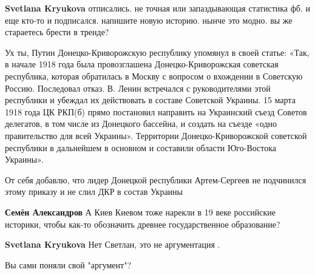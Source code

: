 \begin{itemize}
\begin{itemize}
\textbf{Svetlana Kryukova} отписались. не точная или запаздывающая статистика фб. и еще кто-то и подписался. напишите новую историю. нынче это модно. вы же стараетесь брести в тренде?

 

Ух ты, Путин Донецко-Криворожскую республику упомянул в своей статье: «Так, в
начале 1918 года была провозглашена Донецко-Криворожская советская республика,
которая обратилась в Москву с вопросом о вхождении в Советскую Россию.
Последовал отказ. В. Ленин встречался с руководителями этой республики и
убеждал их действовать в составе Советской Украины. 15 марта 1918 года ЦК
РКП(б) прямо постановил направить на Украинский съезд Советов делегатов, в том
числе из Донецкого бассейна, и создать на съезде «одно правительство для всей
Украины». Территории Донецко-Криворожской советской республики в дальнейшем в
основном и составили области Юго-Востока Украины».

От себя добавлю, что лидер Донецкой республики Артем-Сергеев не подчинился
этому приказу и не слил ДКР в состав Украины

 
\textbf{Семён Александров} А Киев Киевом тоже нарекли в 19 веке российские историки, чтобы как-то обозначить древнее государственное образование?

 
\textbf{Svetlana Kryukova} Нет Светлан, это не аргументация .

 
Вы сами поняли свой "аргумент"?

 

\end{itemize}
\end{itemize}
